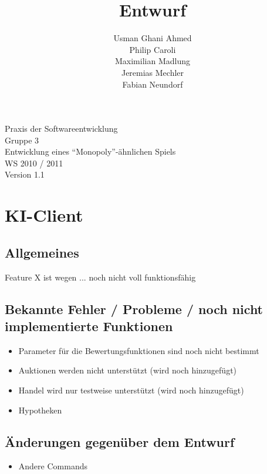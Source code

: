 \documentclass[a4paper,10pt]{article}
\title{Entwurf}
\date{}
\author{Usman Ghani Ahmed \\
Philip Caroli\\
Maximilian Madlung\\ 
Jeremias Mechler\\ 
Fabian Neundorf}
\begin{document}
 
\vspace{5cm}
\maketitle
\begin{center}
\vspace{3cm}
\huge{Praxis der Softwareentwicklung \\
Gruppe 3 \\[0.5cm]
Entwicklung eines "`Monopoly"'-ähnlichen Spiels \\[0.5cm]
WS 2010 / 2011} \\[2cm]
Version 1.1
\end{center}

\newpage

\tableofcontents

\newpage

\section{KI-Client}

\subsection{Allgemeines}
Feature X ist wegen ... noch nicht voll funktionsfähig
\subsection{Bekannte Fehler / Probleme / noch nicht implementierte Funktionen}
\begin{itemize}
\item Parameter für die Bewertungsfunktionen sind noch nicht bestimmt
\item Auktionen werden nicht unterstützt (wird noch hinzugefügt)
\item Handel wird nur testweise unterstützt (wird noch hinzugefügt)
\item Hypotheken
\end{itemize}
\subsection{Änderungen gegenüber dem Entwurf}
\begin{itemize}
\item Andere Commands
\end{itemize}
\end{document}
